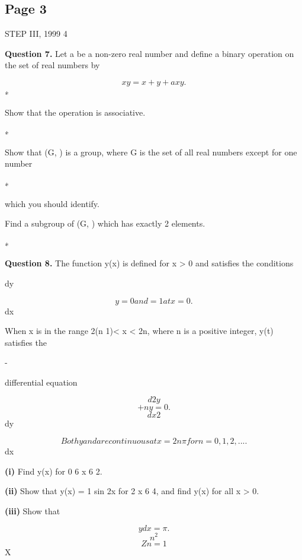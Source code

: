 \documentclass[12pt]{article}
\begin{document}
\subsection*{Page 3}
\begin{flushleft}
STEP III, 1999 4\par
\bigskip\textbf{Question 7.} Let a be a non-zero real number and define a binary operation on the set of real numbers by\par
\[x y = x + y + axy .\]
∗\par
Show that the operation is associative.\par
∗\par
Show that (G, ) is a group, where G is the set of all real numbers except for one number\par
∗\par
which you should identify.\par
Find a subgroup of (G, ) which has exactly 2 elements.\par
∗\par
\bigskip\textbf{Question 8.} The function y(x) is defined for x > 0 and satisfies the conditions\par
dy\par
\[y = 0 and = 1 at x = 0.\]
dx\par
When x is in the range 2(n 1)\pi < x < 2n\pi, where n is a positive integer, y(t) satisfies the\par
-\par
differential equation\par
\[d2y\]
\[+ n y = 0.\]
\[dx2\]
dy\par
\[Both y and are continuous at x = 2n\pi for n = 0, 1, 2, . . . .\]
dx\par
\textbf{(i)} Find y(x) for 0 6 x 6 2\pi.\par
\textbf{(ii)} Show that y(x) = 1 sin 2x for 2 x 6 4\pi, and find y(x) for all x > 0.\par
\textbf{(iii)} Show that\par
\infty \infty\par
\[y dx = \pi .\]
\[n^2\]
\[Z n=1\]
X\par
\end{flushleft}
\end{document}

